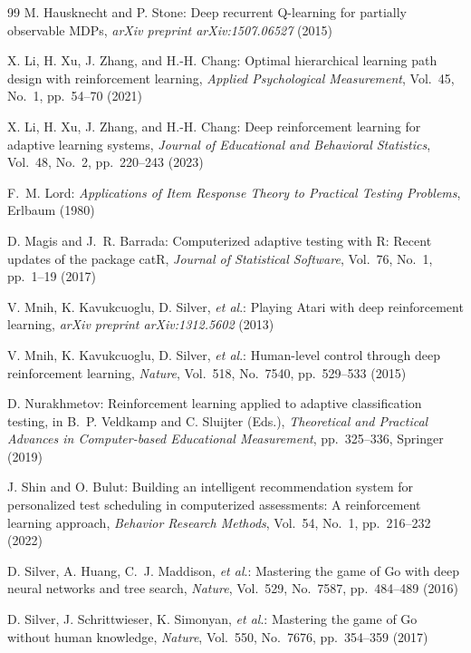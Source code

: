\documentclass[dvipdfmx,a4j]{jarticle}
\begin{document}
\begin{thebibliography}{99}
M. Hausknecht and P. Stone:
Deep recurrent Q-learning for partially observable MDPs,
\textit{arXiv preprint arXiv:1507.06527} (2015)

X. Li, H. Xu, J. Zhang, and H.-H. Chang:
Optimal hierarchical learning path design with reinforcement learning,
\textit{Applied Psychological Measurement}, Vol.~45, No.~1, pp.~54--70 (2021)

X. Li, H. Xu, J. Zhang, and H.-H. Chang:
Deep reinforcement learning for adaptive learning systems,
\textit{Journal of Educational and Behavioral Statistics},
Vol.~48, No.~2, pp.~220--243 (2023)

F.~M. Lord:
\textit{Applications of Item Response Theory to Practical Testing Problems},
Erlbaum (1980)

D. Magis and J.~R. Barrada:
Computerized adaptive testing with R: Recent updates of the package catR,
\textit{Journal of Statistical Software}, Vol.~76, No.~1, pp.~1--19 (2017)

V. Mnih, K. Kavukcuoglu, D. Silver, \textit{et al}.:
Playing Atari with deep reinforcement learning,
\textit{arXiv preprint arXiv:1312.5602} (2013)

V. Mnih, K. Kavukcuoglu, D. Silver, \textit{et al}.:
Human-level control through deep reinforcement learning,
\textit{Nature}, Vol.~518, No.~7540, pp.~529--533 (2015)

D. Nurakhmetov:
Reinforcement learning applied to adaptive classification testing,
in B.~P. Veldkamp and C. Sluijter (Eds.),
\textit{Theoretical and Practical Advances in Computer-based Educational Measurement},
pp.~325--336, Springer (2019)

J. Shin and O. Bulut:
Building an intelligent recommendation system for personalized test scheduling in computerized assessments: A reinforcement learning approach,
\textit{Behavior Research Methods}, Vol.~54, No.~1, pp.~216--232 (2022)

D. Silver, A. Huang, C.~J. Maddison, \textit{et al}.:
Mastering the game of Go with deep neural networks and tree search,
\textit{Nature}, Vol.~529, No.~7587, pp.~484--489 (2016)

D. Silver, J. Schrittwieser, K. Simonyan, \textit{et al}.:
Mastering the game of Go without human knowledge,
\textit{Nature}, Vol.~550, No.~7676, pp.~354--359 (2017)


\end{thebibliography}
\end{document}

